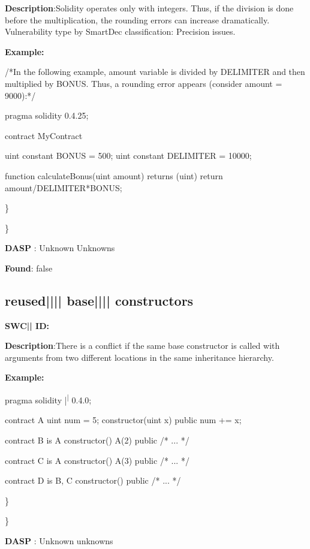 \documentclass{article}
\begin{document}
\textbf{Description}:Solidity operates only with integers. Thus, if the division is done before the multiplication, the rounding errors can increase dramatically. Vulnerability type by SmartDec classification: Precision issues.


\textbf{Example:} 
\begin{ffcode} 

/*In the following example, amount variable is divided by DELIMITER and then multiplied by BONUS. Thus, a rounding error appears (consider amount = 9000):*/ 

pragma solidity 0.4.25;

contract MyContract {

    uint constant BONUS = 500;
    uint constant DELIMITER = 10000;

    function calculateBonus(uint amount) returns (uint) {
        return amount/DELIMITER*BONUS;
    }
}

\end{ffcode} 
\} 

\} 

\textbf{DASP} : Unknown Unknowns

\textbf{Found}: false

\subsection{reused{||\textunderscore|| }base{||\textunderscore|| }constructors} 
\textbf{SWC{|\textunderscore| }ID:} 

\textbf{Description}:There is a conflict if the same base constructor is called with arguments from two different locations in the same inheritance hierarchy.


\textbf{Example:} 
\begin{ffcode} 

pragma solidity |\textsuperscript| 0.4.0;

contract A{
    uint num = 5;
    constructor(uint x) public{
        num += x;
    }
}

contract B is A{
    constructor() A(2) public { /* ... */ }
}

contract C is A {
    constructor() A(3) public { /* ... */ }
}

contract D is B, C {
    constructor() public { /* ... */ }
}

\end{ffcode} 
\} 

\} 

\textbf{DASP} : Unknown unknowns
\end{document}
